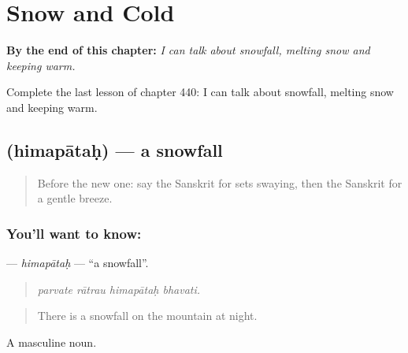 
\chapter{Snow and Cold}
\label{ch:sa-snow-and-cold}

\begin{chapteropening}
\textbf{By the end of this chapter:} \emph{I can talk about snowfall, melting snow and keeping warm.}

Complete the last lesson of chapter 440: I can talk about snowfall, melting snow and keeping warm.
\end{chapteropening}

\section[\texorpdfstring{\sk{हिमपातः} (himapātaḥ)}{हिमपातः (himapātaḥ)}]{ (himapātaḥ) — a snowfall}

\label{lesson:SA-C440-himapatah}



\begin{quote}
Before the new one: say the Sanskrit for sets swaying, then the Sanskrit for a gentle breeze.
\end{quote}

\subsection*{You'll want to know: }
\textbf{} — \emph{himapātaḥ} — \textquotedblleft{}a snowfall\textquotedblright{}.

\begin{quote}
   
\end{quote}

\begin{quote}
\emph{parvate rātrau himapātaḥ bhavati.}
\end{quote}

\begin{quote}
There is a snowfall on the mountain at night.
\end{quote}

A masculine noun.

